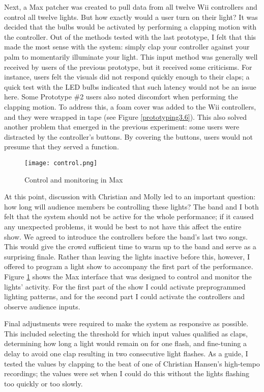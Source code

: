 Next, a Max patcher was created to pull data from all twelve Wii controllers and control all twelve lights. But how exactly would a user turn on their light? It was decided that the bulbs would be activated by performing a clapping motion with the controller. Out of the methods tested with the last prototype, I felt that this made the most sense with the system: simply clap your controller against your palm to momentarily illuminate your light. This input method was generally well received by users of the previous prototype, but it received some criticisms. For instance, users felt the visuals did not respond quickly enough to their claps; a quick test with the LED bulbs indicated that such latency would not be an issue here. Some Prototype \#2 users also noted discomfort when performing the clapping motion. To address this, a foam cover was added to the Wii controllers, and they were wrapped in tape (see Figure \ref{prototyping3.6}). This also solved another problem that emerged in the previous experiment: some users were distracted by the controller's buttons. By covering the buttons, users would not presume that they served a function.

\begin{figure}
	\centering

	\texttt{[image: control.png]}
	\caption{Control and monitoring in Max}

	\label{prototyping3.7}
\end{figure}

At this point, discussion with Christian and Molly led to an important question: how long will audience members be controlling these lights? The band and I both felt that the system should not be active for the whole performance; if it caused any unexpected problems, it would be best to not have this affect the entire show. We agreed to introduce the controllers before the band's last two songs. This would give the crowd sufficient time to warm up to the band and serve as a surprising finale. Rather than leaving the lights inactive before this, however, I offered to program a light show to accompany the first part of the performance. Figure \ref{prototyping3.7} shows the Max interface that was designed to control and monitor the lights' activity. For the first part of the show I could activate preprogrammed lighting patterns, and for the second part I could activate the controllers and observe audience inputs.

Final adjustments were required to make the system as responsive as possible. This included selecting the threshold for which input values qualified as claps, determining how long a light would remain on for one flash, and fine-tuning a delay to avoid one clap resulting in two consecutive light flashes. As a guide, I tested the values by clapping to the beat of one of Christian Hansen's high-tempo recordings; the values were set when I could do this without the lights flashing too quickly or too slowly.

